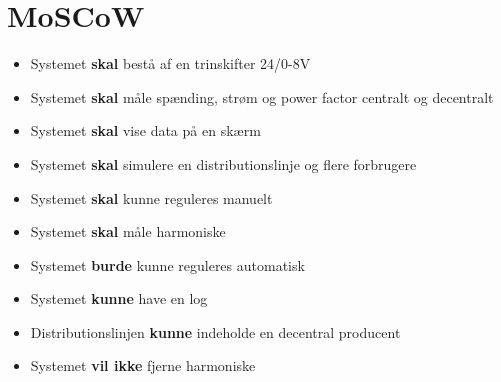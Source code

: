 
\section{MoSCoW}

\begin{itemize}
\item{Systemet \textbf{skal} bestå af en trinskifter 24/0-8V}
\item{Systemet \textbf{skal} måle spænding, strøm og power factor centralt og decentralt}
\item{Systemet \textbf{skal} vise data på en skærm}
\item{Systemet \textbf{skal} simulere en distributionslinje og flere forbrugere}
\item{Systemet \textbf{skal} kunne reguleres manuelt}
\item{Systemet \textbf{skal} måle harmoniske}
\item{Systemet \textbf{burde} kunne reguleres automatisk}
\item{Systemet \textbf{kunne} have en log}
\item{Distributionslinjen \textbf{kunne} indeholde en decentral producent}
\item{Systemet \textbf{vil ikke} fjerne harmoniske} 
\end{itemize}

